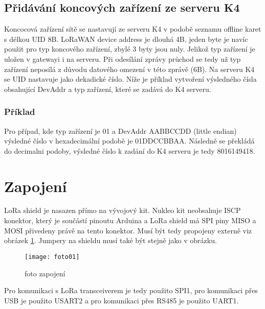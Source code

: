 \subsection{Přidávání koncových zařízení ze serveru K4}
Koncocová zařízení sítě se nastavují ze serveru K4 v podobě seznamu offline karet s délkou UID 8B.
LoRaWAN device address je dlouhá 4B, jeden byte je navíc použit pro typ koncového zařízení, zbylé 3 byty jsou nuly.
Jelikož typ zařízení je uložen v gatewayi i na serveru. Při odesílání zprávy průchod se tedy už typ zařízení neposílá z důvodu datového omezení v této zprávě (6B).
Na serveru K4 se UID nastavuje jako dekadické číslo.
Níže je příklad vytvoření výsledného čísla obsahující DevAddr a typ zařízení, které se zadává do K4 serveru.

\subsubsection{Příklad}
Pro případ, kde typ zařízení je 01 a DevAddr AABBCCDD (little endian) výsledné číslo v hexadecimální podobě je 01DDCCBBAA. Následně se překládá do decimalni podoby, výsledné číslo k zadání do K4 serveru je tedy 8016149418.


\newpage
\section{Zapojení}
LoRa shield \cite{draginoWiki} je nasazen přímo na vývojový kit. 
Nukleo kit neobsahuje ISCP konektor, který je součástí pinoutu Arduina a LoRa shield má SPI piny MISO a MOSI přivedeny právě na tento konektor. Musí být tedy propojeny externě viz obrázek \ref{fig:03}.
Jumpery na shieldu musí také být stejně jako v obrázku.

\begin{figure}[!h]
    \centering
    \texttt{[image: foto01]}
    \caption{foto zapojení}
    \label{fig:03}
\end{figure}


Pro komunikaci s LoRa transceiverem je tedy použito SPI1, pro komunikaci přes USB je použito USART2 a pro komunikaci přes RS485 je použito UART1.


